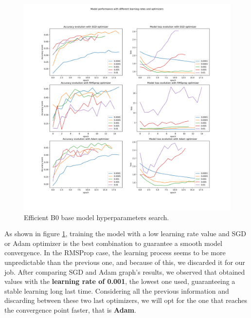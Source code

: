 \begin{figure}[ht]
    \begin{center}
        \includegraphics[scale=0.35]{images/Building/Hyperparameters/Model performance with different learning rates and optimizers.png}
        \caption{Efficient B0 base model hyperparameters search.}
    \label{fig: EfficientB0_hyperparameters}    
    \end{center}
\end{figure}

As shown in figure \ref{fig: EfficientB0_hyperparameters}, training the model with a low learning rate value and SGD or Adam optimizer is the best combination to guarantee a smooth model convergence.  In the RMSProp case, the learning process seems to be more unpredictable than the previous one, and because of this, we discarded it for our job. After comparing SGD and Adam graph's results, we observed that obtained values with the\textbf{ learning rate of 0.001}, the lowest one used, guaranteeing a stable learning long last time. Considering all the previous information and discarding between these two last optimizers, we will opt for the one that reaches the convergence point faster, that is \textbf{Adam}. 

